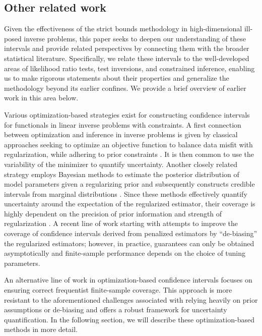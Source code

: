 \documentclass[11pt]{article}
\numberwithin{equation}{section}
\numberwithin{figure}{section}
\begin{document}
\subsection{Other related work}
\label{subsec:RelatedWork}

Given the effectiveness of the strict bounds methodology in high-dimensional ill-posed inverse problems, this paper seeks to deepen our understanding of these intervals and provide related perspectives by connecting them with the broader statistical literature. 
Specifically, we relate these intervals to the well-developed areas of likelihood ratio tests, test inversions, and constrained inference, enabling us to make rigorous statements about their properties and generalize the methodology beyond its earlier confines. 
We provide a brief overview of earlier work in this area below.

Various optimization-based strategies exist for constructing confidence intervals for functionals in linear inverse problems with constraints.
A first connection between optimization and inference in inverse problems is given by classical approaches seeking to optimize an objective function to balance data misfit with regularization, while adhering to prior constraints \cite{hansen1992analysis,hansen1993use}. 
It is then common to use the variability of the minimizer to quantify uncertainty.
Another closely related strategy employs Bayesian methods to estimate the posterior distribution of model parameters given a regularizing prior and subsequently constructs credible intervals from marginal distributions \cite{tarantola2005inverse,stuart2010inverse}. 
Since these methods effectively quantify uncertainty around the expectation of the regularized estimator, their coverage is highly dependent on the precision of prior information and strength of regularization \cite{patil, kuusela_phd_thesis, kuusela2015}. 
A recent line of work starting with \cite{javanmard2014} attempts to improve the coverage of confidence intervals derived from penalized estimators by ``de-biasing'' the regularized estimators; however, in practice, guarantees can only be obtained asymptotically and finite-sample performance depends on the choice of tuning parameters.

An alternative line of work in optimization-based confidence intervals focuses on ensuring correct frequentist finite-sample coverage.  
This approach is more resistant to the aforementioned challenges associated with relying heavily on prior assumptions or de-biasing and offers a robust framework for uncertainty quantification.
In the following section, we will describe these optimization-based methods in more detail.
\end{document}
